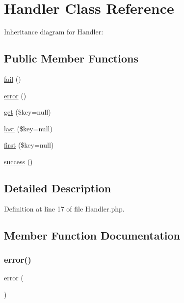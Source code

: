 \hypertarget{class_zest_1_1_auth_1_1_handler}{}\section{Handler Class Reference}
\label{class_zest_1_1_auth_1_1_handler}


Inheritance diagram for Handler\+:
\subsection*{Public Member Functions}
\begin{DoxyCompactItemize}
\item 
\mbox{\hyperlink{class_zest_1_1_auth_1_1_handler_ac59dac7398e43cca6e7a717ac210c750}{fail}} ()
\item 
\mbox{\hyperlink{class_zest_1_1_auth_1_1_handler_a43b8d30b879d4f09ceb059b02af2bc02}{error}} ()
\item 
\mbox{\hyperlink{class_zest_1_1_auth_1_1_handler_a35cbcd6b22933128eaaa6ded4e8d9aef}{get}} (\$key=null)
\item 
\mbox{\hyperlink{class_zest_1_1_auth_1_1_handler_a360a957582276d15bd28200d17d3ed33}{last}} (\$key=null)
\item 
\mbox{\hyperlink{class_zest_1_1_auth_1_1_handler_a8844e8bf9ee1b7d2890e115bb6398cd4}{first}} (\$key=null)
\item 
\mbox{\hyperlink{class_zest_1_1_auth_1_1_handler_ae3aaa78a09e613892295d90324f6a4c0}{success}} ()
\end{DoxyCompactItemize}


\subsection{Detailed Description}


Definition at line 17 of file Handler.\+php.



\subsection{Member Function Documentation}
\mbox{\label{class_zest_1_1_auth_1_1_handler_a43b8d30b879d4f09ceb059b02af2bc02}} 
\subsubsection{\texorpdfstring{error()}{error()}}
{\footnotesize\ttfamily error (\begin{DoxyParamCaption}{ }\end{DoxyParamCaption})}

